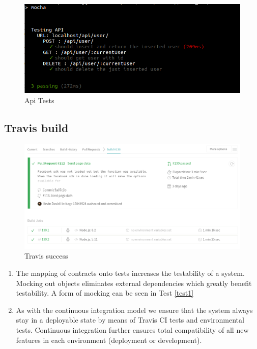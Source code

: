 \documentclass{article}
\begin{document}
	\begin{figure}[H]
	\includegraphics[width=15cm]{images/tests.png}
	\caption{Api Tests}
	\end{figure}
	
	
	\pagebreak
	
	\subsection{Travis build}
	\begin{figure}[H]
	\includegraphics[width=15cm]{images/Travis.png}
	\caption{Travis success }
	\end{figure}	
	
\begin{enumerate}
	\item The mapping of contracts onto tests increases the testability of a system. Mocking out objects eliminates external dependencies which greatly benefit testability. A form of mocking can be seen in Test \ref{test1}
	\item As with the continuous integration model we ensure that the system always stay in a deployable state by means of Travis CI tests and environmental tests. Continuous integration further ensures total compatibility of all new features in each environment (deployment or development).
\end{enumerate}
\end{document}
